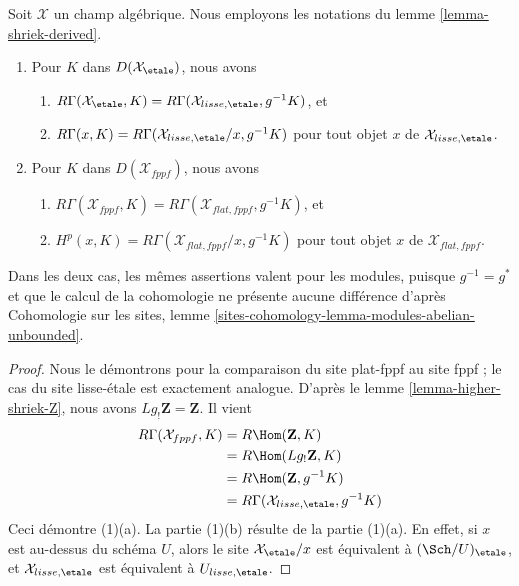 \begin{lemma}
\label{lemma-lisse-etale-cohomology}
Soit $\mathcal{X}$ un champ algébrique. Nous employons les notations du lemme
\ref{lemma-shriek-derived}.
\begin{enumerate}
\item Pour $K$ dans $D(\mathcal{X}_\etale)$, nous avons
\begin{enumerate}
\item $R\Gamma(\mathcal{X}_\etale, K) =
R\Gamma(\mathcal{X}_{lisse,\etale}, g^{-1}K)$, et
\item $R\Gamma(x, K) =
R\Gamma(\mathcal{X}_{lisse,\etale}/x, g^{-1}K)$
pour tout objet $x$ de $\mathcal{X}_{lisse,\etale}$.
\end{enumerate}
\item Pour $K$ dans $D(\mathcal{X}_{fppf})$, nous avons
\begin{enumerate}
\item $R\Gamma(\mathcal{X}_{fppf}, K) =
R\Gamma(\mathcal{X}_{flat,fppf}, g^{-1}K)$, et
\item $H^p(x, K) =
R\Gamma(\mathcal{X}_{flat,fppf}/x, g^{-1}K)$
pour tout objet $x$ de $\mathcal{X}_{flat,fppf}$.
\end{enumerate}
\end{enumerate}
Dans les deux cas, les mêmes assertions valent pour les modules, puisque
$g^{-1} = g^*$ et que le calcul de la cohomologie ne présente aucune différence
d'après Cohomologie sur les sites, lemme
\ref{sites-cohomology-lemma-modules-abelian-unbounded}.
\end{lemma}

\begin{proof}
Nous le démontrons pour la comparaison du site plat-fppf au site fppf ; le cas
du site lisse-\'etale est exactement analogue. D'après le lemme
\ref{lemma-higher-shriek-Z}, nous avons $Lg_!\mathbf{Z} = \mathbf{Z}$. Il vient
\begin{align*}
R\Gamma(\mathcal{X}_{fppf}, K)
& =
R\Hom(\mathbf{Z}, K) \\
& =
R\Hom(Lg_!\mathbf{Z}, K) \\
& =
R\Hom(\mathbf{Z}, g^{-1}K) \\
& =
R\Gamma(\mathcal{X}_{lisse,\etale}, g^{-1}K)
\end{align*}
Ceci démontre (1)(a). La partie (1)(b) résulte de la partie (1)(a). En effet,
si $x$ est au-dessus du schéma $U$, alors le site $\mathcal{X}_\etale/x$ est
équivalent à $(\Sch/U)_\etale$, et $\mathcal{X}_{lisse,\etale}$ est équivalent
à $U_{lisse, \etale}$.
\end{proof}










